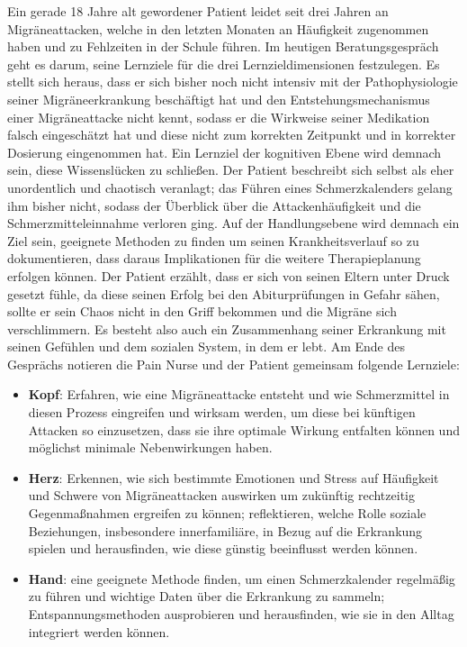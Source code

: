 \documentclass[
  twoside,
  parskip=half-,
  paper=176mm:246mm,
  BCOR=14mm,
  DIV=14,
]{scrreprt}
\begin{document}
\begin{beispiel}
  Ein gerade 18 Jahre alt gewordener Patient leidet seit  drei Jahren an Migräneattacken, welche in den letzten Monaten an Häufigkeit zugenommen haben und zu Fehlzeiten in der Schule führen. Im heutigen Beratungsgespräch geht es darum, seine Lernziele für die drei Lernzieldimensionen festzulegen. Es stellt sich heraus, dass er sich bisher noch nicht intensiv mit der Pathophysiologie seiner Migräneerkrankung beschäftigt hat und den Entstehungsmechanismus einer Migräneattacke nicht kennt, sodass er die Wirkweise seiner Medikation falsch eingeschätzt hat und diese nicht zum korrekten Zeitpunkt und in korrekter Dosierung eingenommen hat. Ein Lernziel der kognitiven Ebene wird demnach sein, diese Wissenslücken zu schließen. Der Patient beschreibt sich selbst als eher unordentlich und chaotisch veranlagt; das Führen eines Schmerzkalenders gelang ihm bisher nicht, sodass der Überblick über die Attackenhäufigkeit und die Schmerzmitteleinnahme verloren ging. Auf der Handlungsebene wird demnach ein Ziel sein, geeignete Methoden zu finden um seinen Krankheitsverlauf so zu dokumentieren, dass daraus Implikationen für die weitere Therapieplanung erfolgen können. Der Patient erzählt, dass er sich von seinen Eltern unter Druck gesetzt fühle, da diese seinen Erfolg bei den Abiturprüfungen in Gefahr sähen, sollte er sein Chaos nicht in den Griff bekommen und die Migräne sich verschlimmern. Es besteht also auch ein Zusammenhang seiner Erkrankung mit seinen Gefühlen und dem sozialen System, in dem er lebt. Am Ende des Gesprächs notieren die Pain Nurse und der Patient gemeinsam folgende Lernziele:
\begin{itemize}
  \item \textbf{Kopf}: Erfahren, wie eine Migräneattacke entsteht und wie Schmerzmittel in diesen Prozess eingreifen und wirksam werden, um diese bei künftigen Attacken so einzusetzen, dass sie ihre optimale Wirkung entfalten können und möglichst minimale Nebenwirkungen haben.
  \item \textbf{Herz}: Erkennen, wie sich bestimmte Emotionen und Stress auf Häufigkeit und Schwere von Migräneattacken auswirken um zukünftig rechtzeitig Gegenmaßnahmen ergreifen zu können; reflektieren, welche Rolle soziale Beziehungen, insbesondere innerfamiliäre, in Bezug auf die Erkrankung spielen und herausfinden, wie diese günstig beeinflusst werden können.
  \item \textbf{Hand}: eine geeignete Methode finden, um einen Schmerzkalender regelmäßig zu führen und wichtige Daten über die Erkrankung zu sammeln; Entspannungsmethoden ausprobieren und herausfinden, wie sie in den Alltag integriert werden können.
\end{itemize} 

\end{beispiel}
\end{document}
